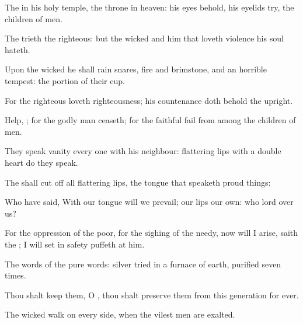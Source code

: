 {\Q {}The
{}
{} in his
holy
temple, the
{}
throne
{} in
heaven: his
eyes
behold, his
eyelids
try, the
children of
men.


\par }{\Q {}The
{}
trieth the
righteous: but the
wicked and him that
loveth
violence his
soul
hateth.


\par }{\Q {}Upon the
wicked he shall
rain
snares,
fire and
brimstone, and an
horrible
tempest:
{} the
portion of their
cup.


\par }{\Q {}For the
righteous
{}
loveth
righteousness; his
countenance doth
behold the
upright.




\par }
{\Q {}Help,
{}; for the godly
man
ceaseth; for the
faithful
fail from among the
children of
men.


\par }{\Q {}They
speak
vanity every
one with his
neighbour:
{}
flattering
lips
{} with a
double
heart do they
speak.


\par }{\Q {}The
{} shall cut
off all
flattering
lips,
{} the
tongue that
speaketh
proud things:


\par }{\Q {}Who have
said, With our
tongue will we
prevail; our
lips
{} our own: who
{}
lord over us?


\par }{\Q {}For the
oppression of the
poor, for the
sighing of the
needy, now will I
arise,
saith the
{}; I will
set
{} in
safety
{}
puffeth at him.


\par }{\Q {}The
words of the
{}
{}
pure
words:
{}
silver
tried in a
furnace of
earth,
purified seven
times.


\par }{\Q {}Thou shalt
keep them, O
{}, thou shalt
preserve them from
this
generation for
ever.


\par }{\Q {}The
wicked
walk on every
side, when the
vilest
men are
exalted.




\par }

